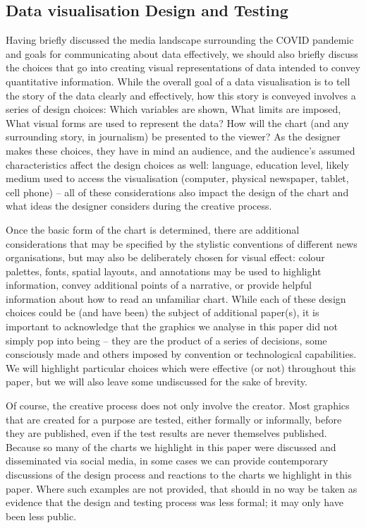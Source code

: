 \documentclass[article]{jdssv}\usepackage[]{graphicx}\usepackage[]{color}
\begin{document}
\subsection{Data visualisation Design and Testing}
Having briefly discussed the media landscape surrounding the COVID pandemic and goals for communicating about data effectively, we should also briefly discuss the choices that go into creating visual representations of data intended to convey quantitative information.
While the overall goal of a data visualisation is to tell the story of the data clearly and effectively, how this story is conveyed involves a series of design choices: Which variables are shown, What limits are imposed, What visual forms are used to represent the data? 
How will the chart (and any surrounding story, in journalism) be presented to the viewer? 
As the designer makes these choices, they have in mind an audience, and the audience's assumed characteristics affect the design choices as well: language, education level, likely medium used to access the visualisation (computer, physical newspaper, tablet, cell phone) -- all of these considerations also impact the design of the chart and what ideas the designer considers during the creative process.

Once the basic form of the chart is determined, there are additional considerations that may be specified by the stylistic conventions of different news organisations, but may also be deliberately chosen for visual effect: colour palettes, fonts, spatial layouts, and annotations may be used to highlight information, convey additional points of a narrative, or provide helpful information about how to read an unfamiliar chart.
While each of these design choices could be (and have been) the subject of  additional paper(s), it is important to acknowledge that the graphics we analyse in this paper did not simply pop into being -- they are the product of a series of decisions, some consciously made and others imposed by convention or technological capabilities.
We will highlight particular choices which were effective (or not) throughout this paper, but we will also leave some undiscussed for the sake of brevity.

Of course, the creative process does not only involve the creator. Most graphics that are created for a purpose are tested, either formally or informally, before they are published, even if the test results are never themselves published. Because so many of the charts we highlight in this paper were discussed and disseminated via social media, in some cases we can provide contemporary discussions of the design process and reactions to the charts we highlight in this paper. Where such examples are not provided, that should in no way be taken as evidence that the design and testing process was less formal; it may only have been less public.
\end{document}
